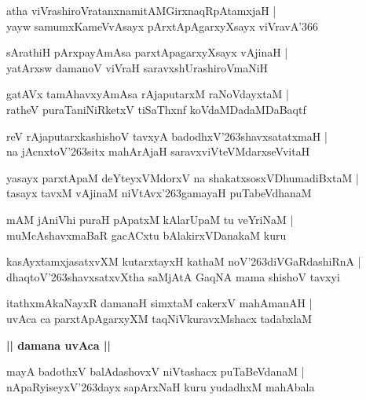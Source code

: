 \documentclass[twoside,12pt,openright]{book}
\def\S{\char'263}
\newcounter{shloka}[chapter]
\def\uvaca#1{\centerline{{\large\textbf{#1}}}}
\begin{document}
\begin{shloka}%
atha viVrashiroVratanxnamitAMGirxnaqRpAtamxjaH |\\
yayw samumxKameVvAsayx pArxtApAgarxyXsayx viVravA\char'366
\end{shloka}

\begin{shloka}%
sArathiH pArxpayAmAsa parxtApagarxyXsayx vAjinaH |\\
yatArxsw damanoV viVraH saravxshUrashiroVmaNiH 
\end{shloka}

\begin{shloka}%
gatAVx tamAhavxyAmAsa rAjaputarxM raNoVdayxtaM |\\
ratheV puraTaniNiRketxV tiSaThxnf koVdaMDadaMDaBaqtf
\end{shloka}

\begin{shloka}%
reV rAjaputarxkashishoV tavxyA badodhxV\S shavxsatatxmaH |\\
na jAcnxtoV\S sitx mahArAjaH saravxviVteVMdarxseVvitaH 
\end{shloka}

\begin{shloka}%
yasayx parxtApaM deYteyxVMdorxV na shakatxsosxVDhumadiBxtaM |\\
tasayx tavxM vAjinaM niVtAvx\S gamayaH puTabeVdhanaM 
\end{shloka}

\begin{shloka}%
mAM  jAniVhi puraH pApatxM kAlarUpaM tu veYriNaM |\\
muMcAshavxmaBaR gacACxtu bAlakirxVDanakaM kuru  
\end{shloka}

\begin{shloka}%
kasAyxtamxjasatxvXM  kutarxtayxH kathaM noV\S diVGaRdashiRnA |\\
dhaqtoV\S shavxsatxvXtha saMjAtA GaqNA mama shishoV tavxyi
\end{shloka}

\begin{shloka}%
itathxmAkaNayxR damanaH simxtaM cakerxV mahAmanAH |\\
uvAca ca parxtApAgarxyXM taqNiVkuravxMshacx tadabxlaM
\end{shloka}

\uvaca{|| damana uvAca ||}

\begin{shloka}%
mayA badothxV balAdashovxV niVtashacx puTaBeVdanaM |\\
nApaRyiseyxV\S dayx sapArxNaH kuru yudadhxM mahAbala 
\end{shloka}
\end{document}
